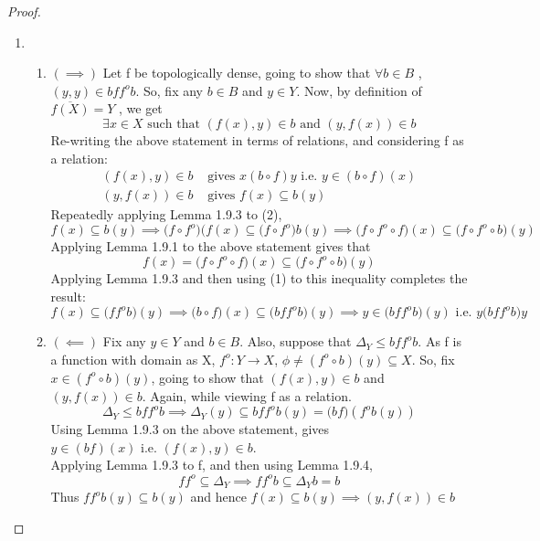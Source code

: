 \documentclass[18pt,a4paper]{article}
\theoremstyle{definition}
\begin{document}
\begin{proof}
\begin{enumerate}[label=(\alph*)]
\begin{enumerate}[label=(\roman*)]
			\end{enumerate}
		\item \begin{enumerate}[label=(\roman*)]
			\item $(\implies)$ Let f be topologically dense, going to show that
				$\forall b\in B$ , $ (y,y) \in bff^ob$. So, fix any $ b\in B$ and
				$y \in Y$. Now, by definition of $\overline{f(X)}=Y $ , we get
				\[\exists x\in X \text{ such that }
				(f(x),y) \in b \text{ and } (y,f(x)) \in b \]
				Re-writing the above statement in terms of relations, and
				considering f as a relation:
				\begin{align}
					(f(x),y) \in b &\text{ gives }  x(b \circ f)y \text{ i.e. }
					y \in (b \circ f)(x)\\
					(y,f(x)) \in b &\text{ gives } f(x)\subseteq b(y)
				\end{align}
				Repeatedly applying Lemma 1.9.3 to (2),
				\[ f(x) \subseteq b(y) \implies
					\big(f \circ f^o \big)(f(x) \subseteq \big(f \circ f^o \big)b(y)
					\implies \big(f \circ f^o \circ f\big)(x) \subseteq
				\big(f \circ f^o \circ b \big)(y)\]
				Applying Lemma 1.9.1 to the above statement gives that
				\[f(x)=\big(f \circ f^o \circ f\big)(x) \subseteq
				\big(f \circ f^o \circ b \big)(y)  \]
				Applying Lemma 1.9.3 and then using (1) to this inequality completes the result:
				\[ f(x) \subseteq \big(ff^ob \big)(y)
					\implies \big(b \circ f\big)(x) \subseteq
				\big(bff^ob \big)(y) \implies y \in \big(bff^ob \big)(y) \text{ i.e. } y\big(bff^ob \big)y   \]
			\item $(\impliedby)$ Fix any $y \in Y$ and $b \in B$. Also, suppose that
				$\Delta_Y \leq bff^o b$. As f is a function with domain as X,
				$f^o :Y \to X$, $\phi \neq (f^o \circ b)(y)
				\subseteq  X$. So, fix $x\in (f^o \circ b)(y)$, going to show that
				$(f(x),y)\in b$	and $(y,f(x)) \in b$. Again, while viewing f as a
				relation.
				\[ \Delta_Y \leq bff^ob
					\implies \Delta_Y(y) \subseteq bf f^o b(y)=\big(bf\big)
				(f^o b(y))\]
				Using Lemma 1.9.3 on the above statement, gives $y \in (bf)(x)
				\text{ i.e. } (f(x),y)\in b $.\\
				Applying Lemma 1.9.3 to f, and then using Lemma 1.9.4,
				\begin{equation*}
					ff^o  \subseteq \Delta_Y \implies f f^o b \subseteq \Delta_Yb=b
				\end{equation*}
				Thus $f f^o b(y) \subseteq b(y)$ and hence $f(x) \subseteq b(y) \implies
				(y,f(x)) \in b$
		\end{enumerate}

\end{enumerate}
\end{proof}
\end{document}
